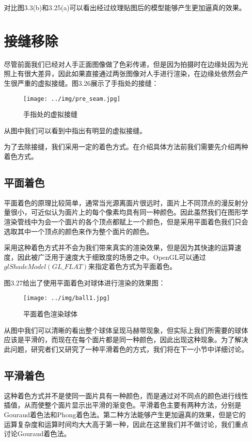 对比图3.3(b)和3.25(a)可以看出经过纹理贴图后的模型能够产生更加逼真的效果。

\section{接缝移除}
尽管前面我们已经对人手正面图像做了色彩传递，但是因为拍摄时在边缘处因为光照上有很大差异，因此如果直接通过两张图像对人手进行渲染，在边缘处依然会产生很严重的虚拟接缝。图3.26展示了手指处的接缝：
\begin{figure}[htb]
\centering
\texttt{[image: ../img/pre\_seam.jpg]}
\caption{手指处的虚拟接缝}
\label{fig：graph}
\end{figure} 

从图中我们可以看到中指出有明显的虚拟接缝。

为了去除接缝，我们采用一定的着色方式。在介绍具体方法前我们需要先介绍两种着色方式\cite{Fshill04}。

\subsection{平面着色}
平面着色的原理比较简单，通常当光源离面片很远时，面片上不同顶点的漫反射分量很小，可近似认为面片上的每个像素均具有同一种颜色。因此虽然我们在图形学渲染管线中为会一个面片的各个顶点都赋上一个颜色，但是采用平面着色我们只会选取其中一个顶点的颜色来作为整个面片的颜色。

采用这种着色方式并不会为我们带来真实的渲染效果，但是因为其快速的运算速度，因此被广泛用于速度大于细致度的场景之中。OpenGL可以通过$glShadeModel(GL\_FLAT)$来指定着色方式为平面着色。

图3.27给出了使用平面着色对球体进行渲染的效果图：

\begin{figure}[htb]
\centering
\texttt{[image: ../img/ball1.jpg]}
\caption{平面着色渲染球体}
\label{fig：graph}
\end{figure} 

从图中我们可以清晰的看出整个球体呈现马赫带现象，但实际上我们所需要的球体应该是平滑的，而现在在每个面片都是同一种颜色，因此出现这种现象。为了解决此问题，研究者们又研究了一种平滑着色的方式，我们将在下一小节中详细讨论。

\subsection{平滑着色}
这种着色方式并不是使同一面片具有一种颜色，而是通过对不同点的颜色进行线性插值，从而使整个面片显示出平滑的渐变色。平滑着色主要有两种方法，分别是Gouraud着色法和Phong着色法。第二种方法能够产生更加逼真的效果，但是它的运算复杂度和运算时间均大大高于第一种，因此在这里我们并不做讨论，我们重点讨论Gouraud着色法。

